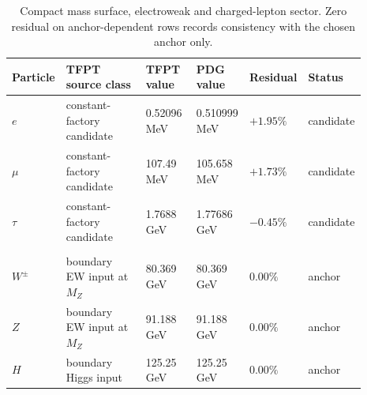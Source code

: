 \begin{table}[p]
\centering
\scriptsize
\setlength{\tabcolsep}{3pt}
\begin{tabularx}{\linewidth}{@{}>{\raggedright\arraybackslash}p{0.10\linewidth}>{\raggedright\arraybackslash}p{0.27\linewidth}>{\raggedleft\arraybackslash}p{0.15\linewidth}>{\raggedleft\arraybackslash}p{0.15\linewidth}>{\raggedleft\arraybackslash}p{0.10\linewidth}>{\raggedright\arraybackslash}p{0.12\linewidth}@{}}
\toprule
Particle & TFPT source class & TFPT value & PDG value & Residual & Status \\
\midrule
$e$ & constant-factory candidate & \num{0.52096} MeV & \num{0.510999} MeV & $+1.95\%$ & candidate \\
$\mu$ & constant-factory candidate & \num{107.49} MeV & \num{105.658} MeV & $+1.73\%$ & candidate \\
$\tau$ & constant-factory candidate & \num{1.7688} GeV & \num{1.77686} GeV & $-0.45\%$ & candidate \\
\midrule
\multicolumn{6}{@{}l}{\textit{Calibration surface (anchor-dependent; zero residual = anchor consistency, not prediction):}} \\
$W^\pm$ & boundary EW input at $M_Z$ & \num{80.369} GeV & \num{80.369} GeV & $0.00\%$ & anchor \\
$Z$ & boundary EW input at $M_Z$ & \num{91.188} GeV & \num{91.188} GeV & $0.00\%$ & anchor \\
$H$ & boundary Higgs input & \num{125.25} GeV & \num{125.25} GeV & $0.00\%$ & anchor \\
\bottomrule
\end{tabularx}
\caption{Compact mass surface, electroweak and charged-lepton sector. Zero residual on anchor-dependent rows records consistency with the chosen anchor only.}
\label{tab:sm-mass-ledger-ew}
\end{table}

